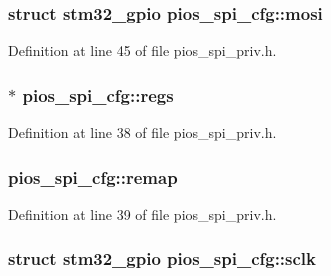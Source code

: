 \hypertarget{structpios__spi__cfg_adaf88353246da685e0f82e927d72eaed}{
\subsubsection[{mosi}]{\setlength{\rightskip}{0pt plus 5cm}struct {\bf stm32\-\_\-gpio} pios\-\_\-spi\-\_\-cfg\-::mosi}}\label{structpios__spi__cfg_adaf88353246da685e0f82e927d72eaed}


Definition at line 45 of file pios\-\_\-spi\-\_\-priv.\-h.

\hypertarget{structpios__spi__cfg_ad167dc65625a3dd4255886c4523b5691}{
\subsubsection[{regs}]{$\ast$ pios\-\_\-spi\-\_\-cfg\-::regs}}\label{structpios__spi__cfg_ad167dc65625a3dd4255886c4523b5691}


Definition at line 38 of file pios\-\_\-spi\-\_\-priv.\-h.

\hypertarget{structpios__spi__cfg_a1318cbf732716210fffe77ecf7e14649}{
\subsubsection[{remap}]{ pios\-\_\-spi\-\_\-cfg\-::remap}}\label{structpios__spi__cfg_a1318cbf732716210fffe77ecf7e14649}


Definition at line 39 of file pios\-\_\-spi\-\_\-priv.\-h.

\hypertarget{structpios__spi__cfg_aa190920ba828502df22a5f665027b20d}{
\subsubsection[{sclk}]{\setlength{\rightskip}{0pt plus 5cm}struct {\bf stm32\-\_\-gpio} pios\-\_\-spi\-\_\-cfg\-::sclk}}\label{structpios__spi__cfg_aa190920ba828502df22a5f665027b20d}


